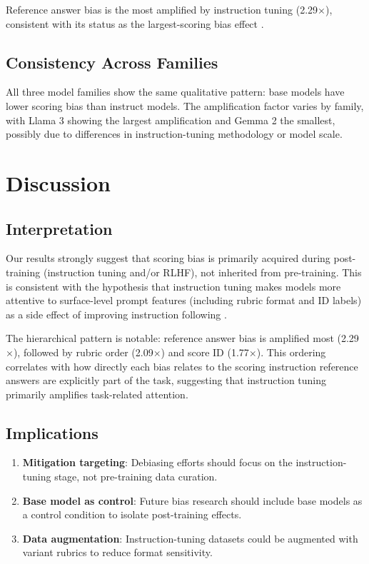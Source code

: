 \documentclass[11pt,twocolumn]{article}
\begin{document}
Reference answer bias is the most amplified by instruction tuning (2.29$\times$), consistent with its status as the largest-scoring bias effect \cite{li2025scoring}.

\subsection{Consistency Across Families}
All three model families show the same qualitative pattern: base models have lower scoring bias than instruct models. The amplification factor varies by family, with Llama 3 showing the largest amplification and Gemma 2 the smallest, possibly due to differences in instruction-tuning methodology or model scale.

\section{Discussion}
\label{sec:discussion}

\subsection{Interpretation}
Our results strongly suggest that scoring bias is primarily acquired during post-training (instruction tuning and/or RLHF), not inherited from pre-training. This is consistent with the hypothesis that instruction tuning makes models more attentive to surface-level prompt features (including rubric format and ID labels) as a side effect of improving instruction following \cite{pan2025user}.

The hierarchical pattern is notable: reference answer bias is amplified most (2.29$\times$), followed by rubric order (2.09$\times$) and score ID (1.77$\times$). This ordering correlates with how directly each bias relates to the scoring instruction  reference answers are explicitly part of the task, suggesting that instruction tuning primarily amplifies task-related attention.

\subsection{Implications}
\begin{enumerate}
    \item \textbf{Mitigation targeting}: Debiasing efforts should focus on the instruction-tuning stage, not pre-training data curation.
    \item \textbf{Base model as control}: Future bias research should include base models as a control condition to isolate post-training effects.
    \item \textbf{Data augmentation}: Instruction-tuning datasets could be augmented with variant rubrics to reduce format sensitivity.
\end{enumerate}
\end{document}
